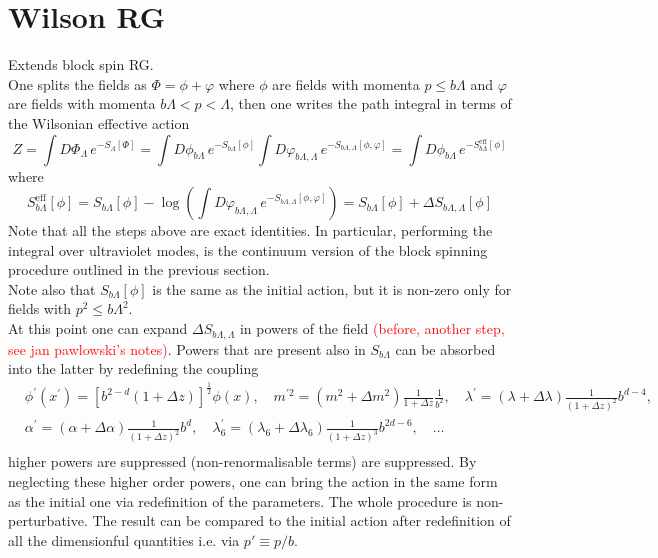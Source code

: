 \section{Wilson RG}
\label{sec:wilson_rg}
Extends block spin RG. \\
One splits the fields as $\Phi = \phi + \varphi$ where $\phi$ are fields with momenta $p \leq b\Lambda$ and $\varphi$ are fields with momenta $b\Lambda < p < \Lambda$, then one writes the path integral in terms of the Wilsonian effective action
\begin{equation*}
    Z = \int D\Phi_\Lambda \, e^{-S_\Lambda[\Phi]} = \int D\phi_{b\Lambda} \, e^{-S_{b\Lambda}[\phi]} \int D\varphi_{b\Lambda, \Lambda}  \, e^{-S_{b\Lambda, \Lambda}[\phi, \varphi]} = \int D\phi_{b\Lambda} \, e^{-S_{b\Lambda}^\text{eff}[\phi]}
\end{equation*}
where 
\begin{equation*}
    S_{b\Lambda}^\text{eff}[\phi] = S_{b\Lambda}[\phi] - \log\left( \int D\varphi_{b\Lambda, \Lambda}  \, e^{-S_{b\Lambda, \Lambda}[\phi, \varphi]}\right) =  S_{b\Lambda}[\phi] + \Delta S_{b\Lambda, \Lambda}[\phi]
\end{equation*}
Note that all the steps above are exact identities. In particular, performing the integral over ultraviolet modes, is the continuum version of the block spinning procedure outlined in the previous section. \\
Note also that $S_{b\Lambda}[\phi]$ is the same as the initial action, but it is non-zero only for fields with $p^2 \leq b\Lambda^2$. \\
At this point one can expand $\Delta S_{b\Lambda, \Lambda}$ in powers of the field \textcolor{red}{(before, another step, see jan pawlowski's notes)}. Powers that are present also in $S_{b\Lambda}$ can be absorbed into the latter by redefining the coupling
\begin{equation}
\begin{aligned}
& \phi^{\prime}\left(x^{\prime}\right)=\left[b^{2-d}(1+\Delta z)\right]^{\frac{1}{2}} \phi(x), \quad m^{\prime 2}=\left(m^2+\Delta m^2\right) \frac{1}{1+\Delta z} \frac{1}{b^2}, \quad \lambda^{\prime}=(\lambda+\Delta \lambda) \frac{1}{(1+\Delta z)^2} b^{d-4}, \\
& \alpha^{\prime}=(\alpha+\Delta \alpha) \frac{1}{(1+\Delta z)^2} b^d, \quad \lambda_6^{\prime}=\left(\lambda_6+\Delta \lambda_6\right) \frac{1}{(1+\Delta z)^3} b^{2 d-6}, \quad \ldots \\
&
\end{aligned}
\end{equation}
higher powers are suppressed (non-renormalisable terms) are suppressed. By neglecting these higher order powers, one can bring the action in the same form as the initial one via redefinition of the parameters. The whole procedure is non-perturbative. The result can be compared to the initial action after redefinition of all the dimensionful quantities i.e. via $p'\equiv p/b$. 

